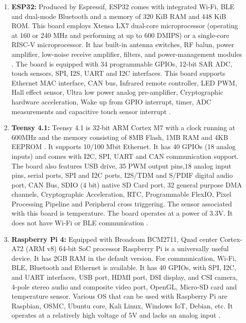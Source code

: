 \documentclass[a4paper,11pt]{article}
\begin{document}
\begin{iotsolution}
\begin{enumerate}
    \item\textbf{ESP32:} Produced by Espressif, ESP32 comes with integrated Wi-Fi, BLE and dual-mode Bluetooth and a memory of 320 KiB RAM and 448 KiB ROM. This board employs Xtensa LX7 dual-core microprocessor (operating at 160 or 240 MHz and performing at up to 600 DMIPS) or a single-core RISC-V microprocessor. It has built-in antenna switches, RF balun, power amplifier, low-noise receive amplifier, filters, and power-management modules \cite{[B4]}. The board is equipped with 34 programmable GPIOs, 12-bit SAR ADC, touch sensors, SPI, I2S, UART and I2C interfaces. This board supports Ethernet MAC interface, CAN bus, Infrared remote controller, LED PWM, Hall effect sensor, Ultra low power analog pre-amplifier, Cryptographic hardware acceleration, Wake up from GPIO interrupt, timer, ADC measurements and capacitive touch sensor interrupt \cite{[A6]}.
    \item\textbf{Teensy 4.1:} Teensy 4.1 is 32-bit ARM Cortex M7 with a clock running at 600MHz and the memory consisting of 8MB Flash, 1MB RAM and 4KB EEPROM . It supports 10/100 Mbit Ethernet. It has 40 GPIOs (18 analog inputs) and comes with I2C, SPI, UART and CAN communication support. The board also features USB drive, 35 PWM output pins,18 analog input pins, serial ports, SPI and I2C ports, I2S/TDM and S/PDIF digital audio port, CAN Bus, SDIO (4 bit) native SD Card port, 32 general purpose DMA channels, Cryptographic Acceleration, RTC, Programmable FlexIO, Pixel Processing Pipeline and Peripheral cross triggering. The sensor associated with this board is temperature. The board operates at a power of 3.3V. It does not have Wi-Fi or BLE communication \cite{[B5]}.
    \item\textbf{Raspberry Pi 4:} Equipped with Broadcom BCM2711, Quad center Cortex-A72 (ARM v8) 64-bit SoC processor Raspberry Pi is a universally useful device. It has 2GB RAM in the default version. For communication, Wi-Fi, BLE, Bluetooth and Ethernet is available. It has 40 GPIOs, with SPI, I2C, and UART interfaces, USB port, HDMI port, DSI display, and CSI camera, 4-pole stereo audio and composite video port, OpenGL, Micro-SD card and temperature sensor. Various OS that can be used with Raspberry Pi are Raspbian, OSMC, Ubuntu core, Kali Linux, Windows IoT, Debian, etc. It operates at a relatively high voltage of 5V and lacks an analog input \cite{[B6]}.
\end{enumerate}

\end{iotsolution}
\end{document}
